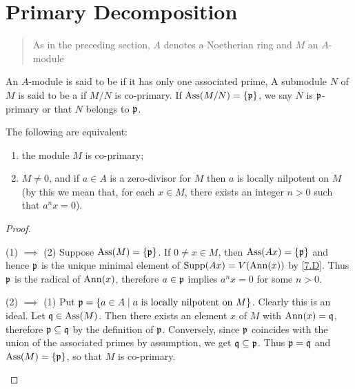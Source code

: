 \documentclass[../main]{subfiles}
\begin{document}
\section{Primary Decomposition}\label{sec:08}

\begin{quote}
As in the preceding section, $A$ denotes a Noetherian ring and $M$ an $A$-module
\end{quote}

\begin{pardefinition}
An $A$-module is said to be  if it has only one associated prime, A submodule $N$ of $M$ is said to be a  if $M/N$ is co-primary. If $\operatorname{Ass}(M/N)=\{\mathfrak{p}\}$, we say $N$ is $\mathfrak{p}$-primary or that $N$ belongs to $\mathfrak{p}$. 
\end{pardefinition}

\begin{parproposition}\label{pro:08.01}
The following are equivalent:
\begin{enumerate}[label=(\arabic*)]
    \item the module $M$ is co-primary;
    \item $M\neq0$, and if $a\in A$ is a zero-divisor for $M$ then $a$ is locally nilpotent on $M$ (by this we mean that, for each $x\in M$, there exists an integer $n > 0$ such that $a^nx = 0$).
\end{enumerate}
\end{parproposition}

\begin{proof}\phantom{,}
\begin{implyenumerate}
    \item[(1) $\implies$ (2)] Suppose $\operatorname{Ass}(M)=\{\mathfrak{p}\}$. If $0\neq x\in M$, then $\operatorname{Ass}(Ax)=\{\mathfrak{p}\}$ and hence $\mathfrak{p}$ is the unique minimal element of $\operatorname{Supp}(Ax) = V(\operatorname{Ann}(x))$ by \ref{7.D}. Thus $\mathfrak{p}$ is the radical of $\operatorname{Ann}(x)$, therefore $a\in \mathfrak{p}$ implies $a^nx = 0$ for some $n > 0$.
    
    \item[(2) $\implies$ (1)] Put $\mathfrak{p}=\{a\in A\mid a\text{ is locally nilpotent on }M\}$. Clearly this is an ideal. Let $\mathfrak{q}\in\operatorname{Ass}(M)$. Then there exists an element $x$ of $M$ with $\operatorname{Ann}(x)=\mathfrak{q}$, therefore $\mathfrak{p}\subseteq\mathfrak{q}$ by the definition of $\mathfrak{p}$. Conversely, since $\mathfrak{p}$ coincides with the union of the associated primes by assumption, we get $\mathfrak{q}\subseteq\mathfrak{p}$. Thus $\mathfrak{p} = \mathfrak{q}$ and $\operatorname{Ass}(M) = \{\mathfrak{p}\}$, so that $M$ is co-primary.
\end{implyenumerate}
\end{proof}
\end{document}
